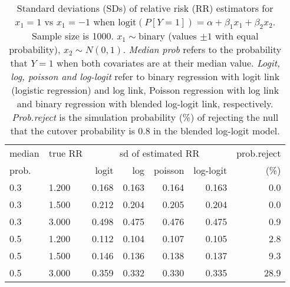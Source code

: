 \documentclass[12pt,a4paper]{article}
\begin{document}
\begin{table}[H] 
\small\sf\centering 
\caption{Standard deviations (SDs) of relative risk (RR) estimators for $x_1=1$ vs $x_1=-1$ when $\mbox{logit}(P[Y=1])=\alpha+\beta_1 x_1 + \beta_2 x_2$. Sample size is 1000. $x_1 \sim $binary (values $\pm 1$ with equal probability), $x_2 \sim N(0,1)$. {\it Median prob} refers to the probability that $Y=1$ when both covariates are at their median value. {\it Logit, log, poisson and log-logit} refer to binary regression with logit link (logistic regression) and log link, Poisson regression with log link and binary regression with blended log-logit link, respectively. {\it Prob.reject} is the simulation probability (\%) of rejecting the null that the cutover probability is $0.8$ in the blended log-logit model.} 
\begin{tabular}{llrrrrr} 
\toprule 
median & true RR & \multicolumn{4}{c}{sd of estimated RR} & prob.reject \\ 
prob. & & logit & log & poisson & log-logit  & (\%) \\ \midrule 
0.3 & 1.200 & 0.168 & 0.163 & 0.164 & 0.163 &  0.0 \\  
0.3 & 1.500 & 0.212 & 0.204 & 0.205 & 0.204 &  0.0 \\  
0.3 & 3.000 & 0.498 & 0.475 & 0.476 & 0.475 &  0.9 \\  
0.5 & 1.200 & 0.112 & 0.104 & 0.107 & 0.105 &  2.8 \\  
0.5 & 1.500 & 0.146 & 0.136 & 0.138 & 0.137 &  9.3 \\  
0.5 & 3.000 & 0.359 & 0.332 & 0.330 & 0.335 & 28.9 \\  
\bottomrule 
\end{tabular} 
\end{table} 
\end{document}

